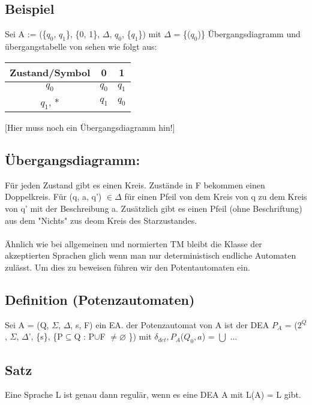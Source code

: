 \documentclass[a4paper,11pt]{article}
\begin{document}
\subsection{Beispiel}
Sei A := (\{$q_{0}$, $q_{1}$\}, \{0, 1\}, $\Delta$, $q_{0}$, \{$q_{1}$\}) mit $\Delta$ = \{($q_{0}$)\}
Übergangsdiagramm und übergangstabelle von sehen wie folgt aus:
\begin{center}
    \begin{tabular}{|c|c|c|}
        \hline
        \textbf{Zustand/Symbol} & \textbf{0} & \textbf{1} \\
        \hline
        $q_{0}$ & $q_{0}$ & $q_{1}$ \\
        \hline
        $q_{1}$, * & $q_{1}$ & $q_{0}$ \\
        \hline
    \end{tabular}            
\end{center}
[Hier muss noch ein Übergangsdiagramm hin!]


\subsection*{Übergangsdiagramm:}
Für jeden Zustand gibt es einen Kreis. Zustände in F bekommen einen Doppelkreis. Für (q, a, q') $\in \Delta$ für einen Pfeil von dem Kreis von q zu dem Kreis von q' mit der Beschreibung a. Zusätzlich gibt es einen Pfeil (ohne Beschriftung) aus dem "Nichts" zus deom Kreis des Starzustandes.\\\\
Ähnlich wie bei allgemeinen und normierten TM bleibt die Klasse der akzeptierten Sprachen glich wenn man nur deterministisch endliche Automaten zulässt. Um dies zu beweisen führen wir den Potentautomaten ein.

\subsection{Definition (Potenzautomaten)}
Sei A = (Q, $\Sigma$, $\Delta$, s, F) ein EA. der Potenzautomat von A ist der DEA $P_{A}$ = ($2^{Q}$, $\Sigma$, $\Delta$', \{s\}, \{P$\subseteq$Q : P$\cup$F $\neq \varnothing $ \}) mit $\delta_{det}, P_{A}$($Q_{0}, a$) = $\bigcup $ $\dots$

\subsection{Satz}
Eine Sprache L ist genau dann regulär, wenn es eine DEA A mit L(A) = L gibt. 
\end{document}

